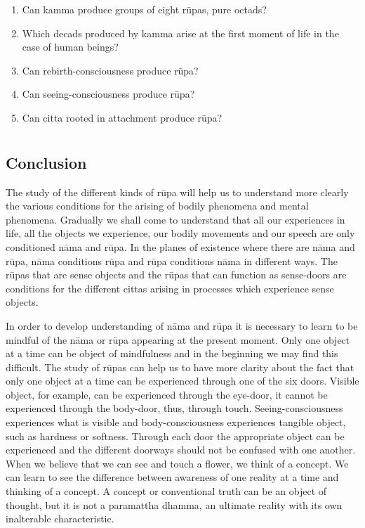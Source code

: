 \documentclass{book}
\begin{document}
\begin{enumerate}
\item Can kamma produce groups of eight r\=upas, pure octads?

\item Which decads produced by kamma arise at the first moment of 
life in the case of human beings?

\item Can rebirth-consciousness produce r\=upa?

\item Can seeing-consciousness produce r\=upa?

\item Can citta rooted in attachment produce r\=upa?
\end{enumerate}





\chapter[Conclusion]{}
\section*{Conclusion}

The study of the different kinds of r\=upa will help us to understand
more clearly the various conditions for the arising of bodily phenomena
and mental phenomena. Gradually we shall come to understand that all
our experiences in life, all the objects we experience, our bodily
movements and our speech are only conditioned n{\=a}ma and r\=upa. In
the planes of existence where there are n{\=a}ma and r\=upa, n{\=a}ma
conditions r\=upa and r\=upa conditions n{\=a}ma in different ways. The
r\=upas that are sense objects and the r\=upas that can function as
sense-doors are conditions for the different cittas arising in
processes which experience sense objects.

In order to develop understanding of n{\=a}ma and r\=upa it is necessary
to learn to be mindful of the n{\=a}ma or r\=upa appearing at the
present moment. Only one object at a time can be object of mindfulness
and in the beginning we may find this difficult. The study of r\=upas
can help us to have more clarity about the fact that only one object at
a time can be experienced through one of the six doors. Visible object,
for example, can be experienced through the eye-door, it cannot be
experienced through the body-door, thus, through touch.
Seeing-consciousness experiences what is visible and
body-consciousness experiences tangible object, such as hardness or
softness. Through each door the appropriate object can be experienced
and the different doorways should not be confused with one another.
When we believe that we can see and touch a flower, we think of a
concept. We can learn to see the difference between awareness of one
reality at a time and thinking of a concept. A concept or
conventional truth can be an object of thought, but it is not a
paramattha dhamma, an ultimate reality with its own inalterable
characteristic. 
\end{document}
